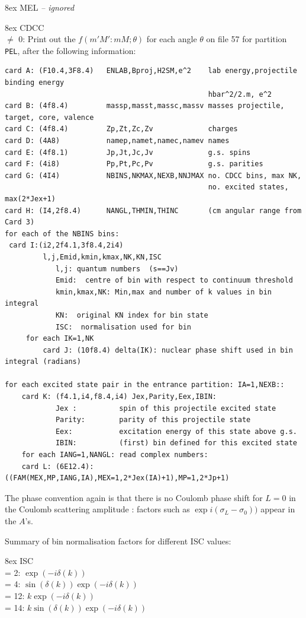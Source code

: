 \documentclass[11pt]{book}
\begin{document}
\hangindent 8ex  MEL   {\em -- ignored}

\hangindent 8ex  CDCC
\\  $\neq$ 0:
Print out the $f(m'M':mM; \theta)$ for each angle $\theta$
on file 57 for partition {\tt PEL}, after the following information:
{\small
\begin{verbatim}
card A: (F10.4,3F8.4)   ENLAB,Bproj,H2SM,e^2    lab energy,projectile binding energy
                                                hbar^2/2.m, e^2
card B: (4f8.4)         massp,masst,massc,massv masses projectile, target, core, valence
card C: (4f8.4)         Zp,Zt,Zc,Zv             charges
card D: (4A8)           namep,namet,namec,namev names
card E: (4f8.1)         Jp,Jt,Jc,Jv             g.s. spins
card F: (4i8)           Pp,Pt,Pc,Pv             g.s. parities
card G: (4I4)           NBINS,NKMAX,NEXB,NNJMAX no. CDCC bins, max NK,
                                                no. excited states, max(2*Jex+1)
card H: (I4,2f8.4)      NANGL,THMIN,THINC       (cm angular range from Card 3)
for each of the NBINS bins:
 card I:(i2,2f4.1,3f8.4,2i4)
         l,j,Emid,kmin,kmax,NK,KN,ISC
            l,j: quantum numbers  (s==Jv)
            Emid:  centre of bin with respect to continuum threshold
            kmin,kmax,NK: Min,max and number of k values in bin integral
            KN:  original KN index for bin state
            ISC:  normalisation used for bin
     for each IK=1,NK
         card J: (10f8.4) delta(IK): nuclear phase shift used in bin integral (radians)

for each excited state pair in the entrance partition: IA=1,NEXB::
    card K: (f4.1,i4,f8.4,i4) Jex,Parity,Eex,IBIN:
            Jex :          spin of this projectile excited state
            Parity:        parity of this projectile state
            Eex:           excitation energy of this state above g.s.
            IBIN:          (first) bin defined for this excited state
    for each IANG=1,NANGL: read complex numbers:
    card L: (6E12.4): ((FAM(MEX,MP,IANG,IA),MEX=1,2*Jex(IA)+1),MP=1,2*Jp+1)
\end{verbatim}
}
The phase convention again is that there is no Coulomb phase shift
for $L = 0$ in the Coulomb scattering amplitude : factors such as
$\exp i(\sigma_L-\sigma_0))$  appear in the $A$'s.


Summary of bin normalisation factors for different ISC values:

\hangindent 8ex
ISC
\\ = 2:  $\exp(-i\delta(k))$
\\ = 4:  $\sin(\delta(k))\exp(-i\delta(k))$
\\ = 12:  $k\exp(-i\delta(k))$
\\ = 14:  $k\sin(\delta(k))\exp(-i\delta(k))$
\end{document}
